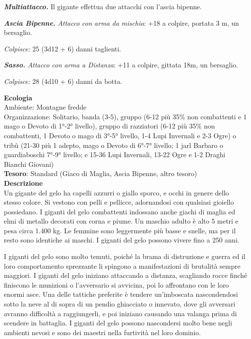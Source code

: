 \begin{multicols}{2}
	\textit{\textbf{Multiattacco.}} Il gigante effettua due attacchi con l'ascia bipenne.

	\textit{\textbf{Ascia Bipenne.} Attacco con arma da mischia}: +18 a colpire, portata 3 m, un bersaglio.

	\textit{Colpisce:} 25 (3d12 + 6) danni taglienti.

	\textit{\textbf{Sasso.} Attacco con arma a Distanza}: +11 a colpire, gittata 18m, un bersaglio.

	\textit{Colpisce:} 28 (4d10 + 6) danni da botta.

	\textbf{Ecologia}\\
	Ambiente: Montagne fredde\\
	Organizzazione: Solitario, banda (3-5), gruppo (6-12 più 35\% non combattenti e 1 mago o Devoto di 1°-2° livello), gruppo di razziatori (6-12 più 35\% non combattenti, 1 Devoto o mago di 3°-5° livello, 1-4 Lupi Invernali e 2-3 Ogre) o tribù (21-30 più 1 adepto, mago o Devoto di 6°-7° livello; 1 jarl Barbaro o guardiaboschi 7°-9° livello; e 15-36 Lupi Invernali, 13-22 Ogre e 1-2 Draghi Bianchi Giovani)\\
	\textbf{Tesoro}: Standard (Giaco di Maglia, Ascia Bipenne, altro tesoro)\\
	\textbf{Descrizione}\\
	Un gigante del gelo ha capelli azzurri o giallo sporco, e occhi in genere dello stesso colore. Si vestono con pelli e pellicce, adornandosi con qualsiasi gioiello possiedano. I giganti del gelo combattenti indossano anche giachi di maglia ed elmi di metallo decorati con corna e piume. Un maschio adulto è alto 5 metri e pesa circa 1.400 kg. Le femmine sono leggermente più basse e snelle, ma per il resto sono identiche ai maschi. I giganti del gelo possono vivere fino a 250 anni.

	I giganti del gelo sono molto temuti, poiché la brama di distruzione e guerra ed il loro comportamento sprezzante li spingono a manifestazioni di brutalità sempre maggiori. I giganti del gelo iniziano attaccando a distanza, scagliando rocce finché finiscono le munizioni o l'avversario si avvicina, poi lo affrontano con le loro enormi asce. Una delle tattiche preferite è tendere un'imboscata nascondendosi sotto la neve al di sopra di un pendio ghiacciato o innevato, dove gli avversari avranno difficoltà a raggiungerli, e poi iniziano causando una valanga prima di scendere in battaglia. I giganti del gelo possono nascondersi molto bene negli ambienti nevosi e sono dei maestri nella furtività nel loro dominio.


\end{multicols}
